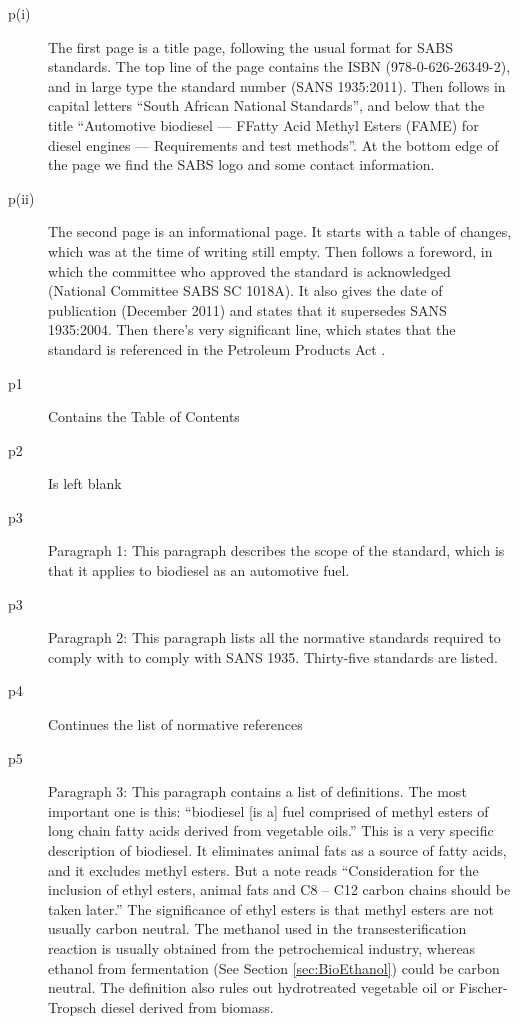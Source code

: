 \begin{description}


\item[p(i)]{The first page is a title page, following the usual format for SABS
standards. The top line of the page contains the ISBN (978-0-626-26349-2), and
in large type the standard number (SANS 1935:2011). Then follows in capital
letters ``South African National Standards'', and below that the title
``Automotive biodiesel --- FFatty Acid Methyl Esters (FAME) for diesel engines
--- Requirements and test methods''. At the bottom edge of the page we find the
SABS logo and some contact information.}

\item[p(ii)]{The second page is an informational page. It starts with a table of
changes, which was at the time of writing still empty. Then follows a foreword,
in which the committee who approved the standard is acknowledged (National
Committee SABS SC 1018A). It also gives the date of publication (December 2011)
and states that it supersedes SANS 1935:2004. Then there's very significant
line, which states that the standard is referenced in the Petroleum Products Act
\autocite{Act120-1997}. }
	
\item[p1]{Contains the Table of Contents} 

\item[p2]{Is left blank}

\item[p3]{Paragraph 1: This paragraph describes the scope of the standard, which
is that it applies to biodiesel as an automotive fuel.} 

\item[p3]{Paragraph 2:
This paragraph lists all the normative standards required to comply with to
comply with SANS 1935. Thirty-five standards are listed.} 

\item[p4]{Continues the list of normative references}

\item[p5]{Paragraph 3: This paragraph contains a list of definitions. The most
important one is this: ``biodiesel [is a] fuel comprised of methyl esters of
long chain fatty acids derived from vegetable oils.'' This is a very specific
description of biodiesel. It eliminates animal fats as a source of fatty acids,
and it excludes methyl esters. But a note reads ``Consideration for the
inclusion of ethyl esters, animal fats and C8 – C12 carbon chains should be
taken later.'' The significance of ethyl esters is that methyl esters are not
usually carbon neutral. The methanol used in the transesterification reaction is
usually obtained from the petrochemical industry, whereas ethanol from
fermentation (See Section \ref{sec:BioEthanol}) could be carbon neutral. The
definition also rules out hydrotreated vegetable oil or Fischer-Tropsch diesel
derived from biomass.}


\end{description}
